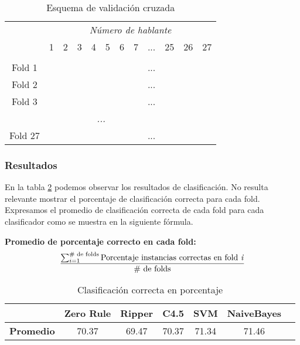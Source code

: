 \begin{table}[H]
	\centering
	\begin{tabular}{cccccccccccc}
		& \multicolumn{11}{c}{\textit{Número de hablante}} \\
		& 1 & 2 & 3 & 4 & 5 & 6 & 7 & ... & 25 & 26 & 27 \\
		\hline \\
		Fold 1 &\mycirc[red] & \mycirc[blue] & \mycirc[blue]  & \mycirc[blue]  & \mycirc[blue]  & \mycirc[blue]  & \mycirc[blue] & ... & \mycirc[blue] & \mycirc[blue] & \mycirc[blue]  \\
		
		Fold 2 &\mycirc[blue] & \mycirc[red] & \mycirc[blue]  & \mycirc[blue]  & \mycirc[blue]  & \mycirc[blue]  & \mycirc[blue] & ... & \mycirc[blue] & \mycirc[blue] & \mycirc[blue]  \\
		
		Fold 3 &\mycirc[blue] & \mycirc[blue] & \mycirc[red]  & \mycirc[blue]  & \mycirc[blue]  & \mycirc[blue]  & \mycirc[blue] & ... & \mycirc[blue] & \mycirc[blue] & \mycirc[blue]  \\
	
		\multicolumn{11}{c}{\textit{...}}	\\
		
		Fold 27 &\mycirc[blue] & \mycirc[blue] & \mycirc[blue]  & \mycirc[blue]  & \mycirc[blue]  & \mycirc[blue]  & \mycirc[blue] & ... & \mycirc[blue] & \mycirc[blue] & \mycirc[red]   \\
	
	\end{tabular}
	\caption{Esquema de validación cruzada}
	\label{HPTDT_esq_cv}
\end{table}
		
\subsubsection{Resultados}

En la tabla \ref{HPTDT_clas_xval_porHab} podemos observar los resultados de clasificación. No resulta relevante mostrar el porcentaje de clasificación correcta para cada fold. Expresamos el promedio de clasificación correcta de cada fold para cada clasificador como se muestra en la siguiente fórmula.

\textbf{Promedio de porcentaje correcto en cada fold:}
\[
{ \sum_{i=1}^{\text{\# de folds}} \text{Porcentaje instancias correctas en fold \textit{i}}
	\over
	\text{\# de folds}
}
\]

\begin{table}[H]
	\centering
	\begin{tabular}{|l|c|c|c|c|c|c|}
		\hline
		\textbf{}  & \textbf{Zero Rule} & \textbf{Ripper} & \textbf{C4.5} & \textbf{SVM} & \textbf{NaiveBayes} \\ \hline
		\textbf{Promedio} & 70.37  & 69.47 & 70.37 & 71.34 & 71.46 \\ \hline
	\end{tabular}
	\caption{Clasificación correcta en porcentaje}
	\label{HPTDT_clas_xval_porHab}
\end{table}

